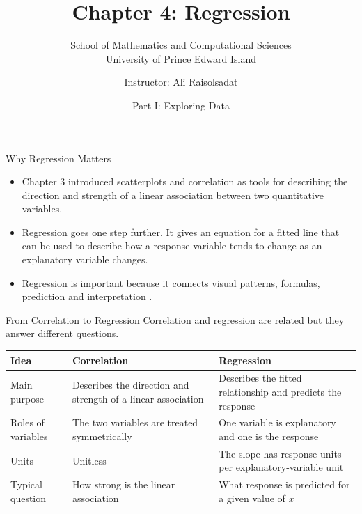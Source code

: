 \documentclass[aspectratio=169]{beamer}
\title[Chapter 4: Regression]{\textbf{Chapter 4: Regression}}
\subtitle{School of Mathematics and Computational Sciences \\ University of Prince Edward Island}
\author{Instructor: Ali Raisolsadat}
\date{Part I: Exploring Data}
\begin{document}
\begin{frame}
  \titlepage
\end{frame}

\begin{frame}{Why Regression Matters}
\begin{itemize}
	\item Chapter 3 introduced scatterplots and correlation as tools for describing the direction and strength of a linear association between two quantitative variables.
	\item Regression goes one step further. It gives an equation for a fitted line that can be used to describe how a response variable tends to change as an explanatory variable changes.
	\item Regression is important because it connects visual patterns, formulas, prediction and interpretation .
\end{itemize}
\end{frame}

\begin{frame}{From Correlation to Regression}
Correlation and regression are related but they answer different questions.

\begin{table}
\centering
\small
\begin{tabularx}{\textwidth}{>{\RaggedRight\arraybackslash}p{} >{\RaggedRight\arraybackslash}p{} X}
\toprule
Idea & Correlation & Regression \\
\midrule
Main purpose & Describes the direction and strength of a linear association & Describes the fitted relationship and predicts the response \\
Roles of variables & The two variables are treated symmetrically & One variable is explanatory and one is the response \\
Units & Unitless & The slope has response units per explanatory-variable unit \\
Typical question & How strong is the linear association & What response is predicted for a given value of $x$ \\
\bottomrule
\end{tabularx}
\end{table}
\end{frame}
\end{document}
